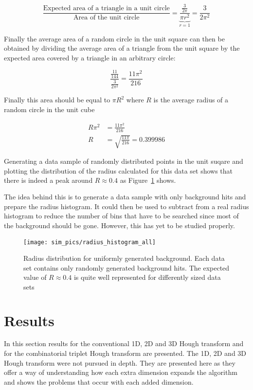 \documentclass[11pt]{scrreprt}
\begin{document}
\[
\frac{\text{Expected area of a triangle in a unit circle}}{\text{Area of the unit circle}} = \underbrace{\frac{\frac{3}{2\pi}}{\pi r^2}}_{r=1} = \frac{3}{2\pi^2}
\]

Finally the average area of a random circle in the unit square can then be obtained by dividing the average area of a triangle from the unit square by the expected area covered by a triangle in an arbitrary circle:

\[
  \frac{\frac{11}{144}}{\frac{3}{2\pi^2}} = \frac{11\pi^2}{216}
\]

Finally this area should be equal to $\pi R^2$ where $R$ is the average radius of a random circle in the unit cube

\begin{align}
  R\pi^2 &= \frac{11\pi^2}{216}\nonumber\\
  R &= \sqrt{\frac{11\pi}{216}} = 0.399986\nonumber
\end{align}

Generating a data sample of randomly distributed points in the unit suqare and plotting the distribution of the radius calculated for this data set shows that there is indeed a peak around
 $R\approx 0.4$ as Figure~\ref{fig:rad_dist} shows.
 
The idea behind this is to generate a data sample with only background hits and prepare the radius histogram. It could then be used to subtract from a real radius histogram to reduce the number of bins that have to be searched since most of the background should be gone. However, this has yet to be studied properly.

 \begin{figure}[tb]
   \centering
   \texttt{[image: sim\_pics/radius\_histogram\_all]}
   \caption[Radius distribution for background]{Radius distribution for uniformly generated 
    background. Each data set contains only randomly generated background hits. The expected value of $R\approx 0.4$
   is quite well represented for differently sized data sets}
   \label{fig:rad_dist}
 \end{figure}

\chapter{Results}
\label{cha:results}
In this section results for the conventional 1D, 2D and 3D Hough transform and 
for the combinatorial triplet Hough transform are presented. The 1D, 2D and 3D Hough transform
were not pursued in depth. They are presented here as they offer a 
way of understanding how each extra dimension expands the algorithm and shows the problems that occur with each added dimension.
\end{document}
